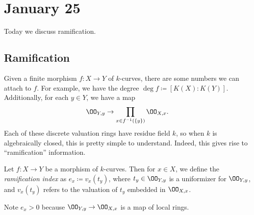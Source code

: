 \documentclass[../notes.tex]{subfiles}
\begin{document}
\section{January 25}

Today we discuss ramification.

\subsection{Ramification}
Given a finite morphism $f\colon X\to Y$ of $k$-curves, there are some numbers we can attach to $f$. For example, we have the degree $\deg f\coloneqq[K(X):K(Y)]$. Additionally, for each $y\in Y$, we have a map
\[\OO_{Y,y}\to\prod_{x\in f^{-1}(\{y\})}\OO_{X,x}.\]
Each of these discrete valuation rings have residue field $k$, so when $k$ is algebraically closed, this is pretty simple to understand. Indeed, this gives rise to ``ramification'' information.
\begin{definition}[ramification]
	Let $f\colon X\to Y$ be a morphism of $k$-curves. Then for $x\in X$, we define the \textit{ramification index} as $e_x\coloneqq v_x(t_y)$, where $t_y\in\OO_{Y,y}$ is a uniformizer for $\OO_{Y,y}$, and $v_x(t_y)$ refers to the valuation of $t_y$ embedded in $\OO_{X,x}$.
\end{definition}
Note $e_x>0$ because $\OO_{Y,y}\to\OO_{X,x}$ is a map of local rings.
\end{document}
